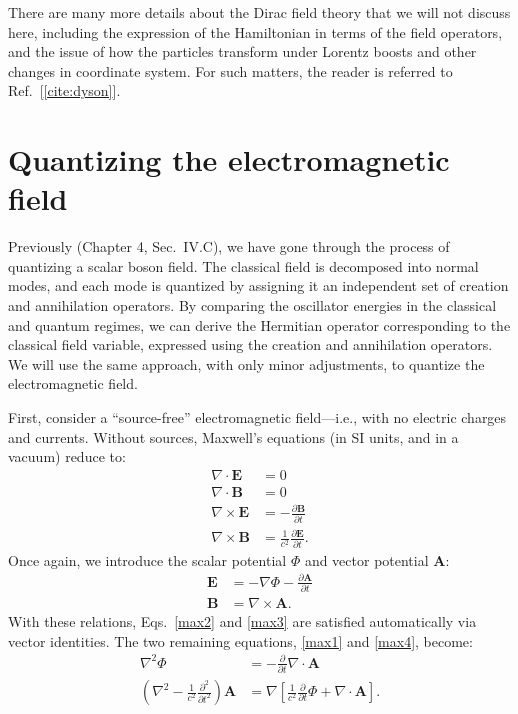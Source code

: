 \documentclass[prx,12pt]{revtex4-2}
\begin{document}
There are many more details about the Dirac field theory that we will
not discuss here, including the expression of the Hamiltonian in terms
of the field operators, and the issue of how the particles transform
under Lorentz boosts and other changes in coordinate system.  For such
matters, the reader is referred to Ref.~[\ref{cite:dyson}].

\section{Quantizing the electromagnetic field}
\label{sec:em_quantization}

Previously (Chapter 4, Sec.~IV.C), we have gone through the process of
quantizing a scalar boson field.  The classical field is decomposed
into normal modes, and each mode is quantized by assigning it an
independent set of creation and annihilation operators.  By comparing
the oscillator energies in the classical and quantum regimes, we can
derive the Hermitian operator corresponding to the classical field
variable, expressed using the creation and annihilation operators.  We
will use the same approach, with only minor adjustments, to quantize
the electromagnetic field.

First, consider a ``source-free'' electromagnetic field---i.e., with
no electric charges and currents.  Without sources, Maxwell's
equations (in SI units, and in a vacuum) reduce to:
\begin{align}
  \nabla\cdot \mathbf{E} &= 0 \label{max1} \\
  \nabla\cdot \mathbf{B} &= 0 \label{max2}\\
  \nabla\times \mathbf{E} &= -\frac{\partial \mathbf{B}}{\partial t} \label{max3}\\
  \nabla\times \mathbf{B} &= \frac{1}{c^2} \frac{\partial \mathbf{E}}{\partial t}.
  \label{max4}
\end{align}
Once again, we introduce the scalar potential $\Phi$ and vector
potential $\mathbf{A}$:
\begin{align}
  \mathbf{E} &= - \nabla \Phi - \frac{\partial\mathbf{A}}{\partial t}
  \label{Efield} \\
  \mathbf{B} &= \nabla \times \mathbf{A}.
  \label{Bfield}
\end{align}
With these relations, Eqs.~\eqref{max2} and \eqref{max3} are satisfied
automatically via vector identities.  The two remaining equations,
\eqref{max1} and \eqref{max4}, become:
\begin{align}
  \nabla^2 \Phi &= -\frac{\partial}{\partial t} \nabla \cdot \mathbf{A} \label{max5} \\
  \left(\nabla^2 - \frac{1}{c^2}\frac{\partial^2}{\partial t^2}\right)
  \mathbf{A} &= \nabla\left[\frac{1}{c^2}\frac{\partial}{\partial t}  \Phi + \nabla\cdot\mathbf{A}\right]. \label{max6}
\end{align}
\end{document}
